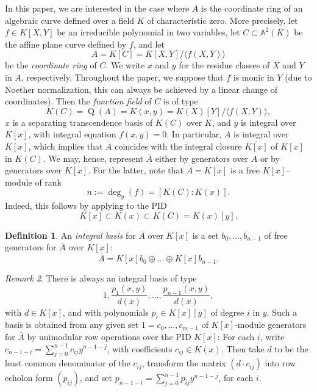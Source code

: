 \documentclass[a4paper,11pt]{amsart}%
\theoremstyle{definition}
\newtheorem{defn}{Definition}[section]
\theoremstyle{plain}
\theoremstyle{remark}
\newtheorem{remark}[defn]{Remark}
\DeclareMathOperator{\TQR}{Q}
\begin{document}
In this paper, we are interested in the case where $A$ is the coordinate ring
of an algebraic curve defined over a field $K$ of characteristic zero. More
precisely, let $f\in K[X,Y]$ be an irreducible polynomial
in two variables, let
$C\subset\mathbb{A}^{2}(K)$ be the affine plane curve defined by $f$, and let
\[
A=K[C]=K[X,Y]/\langle f(X,Y)\rangle
\]
be the {\emph{coordinate ring}} of $C$. We write $x$ and $y$ for the residue
classes of $X$ and $Y$ in $A$, respectively. Throughout the paper, we suppose
that $f$ is monic in $Y$ (due to Noether normalization, this can always be
achieved by a linear change of coordinates). Then the {\emph{function field}}
of $C$ is of type
\[
K(C)=\TQR(A)=K(x,y)=K(X)[Y]/\langle f(X,Y)\rangle,
\]
$x$ is a separating transcendence basis of $K(C)$ over $K$, and $y$ is
integral over $K[x]$, with integral equation $f(x,y)=0$. In particular, $A$ is
integral over $K[x]$, which implies that $\overline{A}$ coincides with the
integral closure $\overline{K[x]}$ of $K[x]$ in $K(C)$. We may, hence,
represent $\overline{A}$ either by generators over $A$ or by generators over
$K[x]$. For the latter, note that $\overline{A}=\overline{K[x]}$ is a free
$K[x]$--module of rank
\[
n:=\deg_{y}(f)=[K(C):K(x)].
\]
Indeed, this follows by applying \cite[Theorem 3.3.4]{Stichtenoth08} to the PID 
$$
K[x]\subset K(x)\subset K(C) = K(x)[y].
$$

\begin{defn}
An {\emph{integral basis}} for $\overline{A}$ over $K[x]$ is a set $b_{0}, \dots, b_{n-1}$
of free generators for $\overline{A}$ over $K[x]$:
\[
\overline{A} = K[x] b_{0} \oplus\dots\oplus K[x] b_{n-1}.
\]
\end{defn}

\begin{remark}
\label{rem:spec-int-basis}
There is always an integral basis of type
$$
1, \frac{p_1(x,y)}{d(x)}, \dots, \frac{p_{n-1}(x,y)}{d(x)},
$$
with $d \in K[x]$, and with polynomials $p_i\in K[x][y]$ of degree $i$ in $y$. 
Such a basis is obtained from any 
given set $1=c_0, \dots, c_{m-1}$ of $K[x]$-module generators for $\overline{A}$
by unimodular row operations over the PID $K[x]$: For each $i$, write
$c_{n-1-i}=\sum_{j=0}^{n-1}c_{ij}y^{n-1-j}$, with coefficients $c_{ij}\in K(x)$.
Then take $d$ to be the least common denominator of the $c_{ij}$, 
transform the matrix $(d\cdot c_{ij})$ into row echolon form 
$(p_{ij})$, and set $p_{n-1-i}=\sum_{j=0}^{n-1}p_{ij}y^{n-1-j}$, 
for each $i$.
\end{remark}
\end{document}
